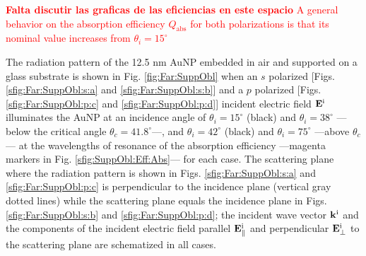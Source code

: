 \textcolor{red}{\textbf{Falta discutir las graficas de las eficiencias en este espacio}
A general behavior on the absorption efficiency $Q_\text{abs}$ for both polarizations is that its nominal value increases from $\theta_i = 15^\circ$
}

The radiation pattern of the 12.5 nm AuNP embedded in air and supported on a glass substrate is shown in Fig. \ref{fig:Far:SuppObl} when an $s$ polarized [Figs. \ref{sfig:Far:SuppObl:s:a} and \ref{sfig:Far:SuppObl:s:b}] and a  $p$ polarized [Figs. \ref{sfig:Far:SuppObl:p:c} and \ref{sfig:Far:SuppObl:p:d}] incident electric field $\vb{E}^\text{i}$ illuminates the AuNP at an incidence angle of $\theta_i = 15^\circ$ (black) and $\theta_i = 38^\circ$ ---below the critical angle $\theta_c = 41.8^\circ$---, and $\theta_i = 42^\circ$ (black) and $\theta_i = 75^\circ$ ---above  $\theta_c$--- at the wavelengths of resonance of the absorption efficiency ---magenta markers in Fig. \ref{sfig:SuppObl:Eff:Abs}--- for each case. The scattering plane where the radiation pattern is shown in Figs. \ref{sfig:Far:SuppObl:s:a} and \ref{sfig:Far:SuppObl:p:c}  is perpendicular to the incidence plane (vertical gray dotted lines) while the scattering plane equals the incidence plane in Figs. \ref{sfig:Far:SuppObl:s:b} and \ref{sfig:Far:SuppObl:p:d}; the incident wave vector $\vb{k}^\text{i}$ and the components of the incident electric field parallel $\vb{E}^\text{i}_\parallel$ and perpendicular $\vb{E}^\text{i}_\perp$ to the scattering plane are schematized in all cases.

